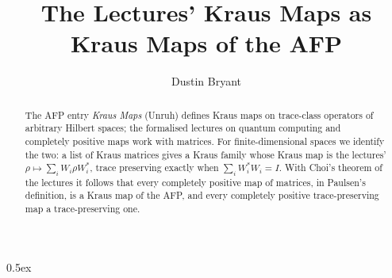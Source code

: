 \documentclass[11pt,a4paper]{article}
\begin{document}
\title{The Lectures' Kraus Maps as Kraus Maps of the AFP}
\author{Dustin Bryant}
\maketitle

\begin{abstract}
The AFP entry \emph{Kraus Maps} (Unruh) defines Kraus maps on trace-class operators of arbitrary
Hilbert spaces; the formalised lectures on quantum computing and completely positive maps work
with matrices.  For finite-dimensional spaces we identify the two: a list of Kraus matrices gives a
Kraus family whose Kraus map is the lectures' $\rho\mapsto\sum_iW_i\rho W_i^*$, trace preserving
exactly when $\sum_iW_i^*W_i=I$.  With Choi's theorem of the lectures it follows that every
completely positive map of matrices, in Paulsen's definition, is a Kraus map of the AFP, and every
completely positive trace-preserving map a trace-preserving one.
\end{abstract}

\parindent 0pt\parskip 0.5ex


\end{document}
